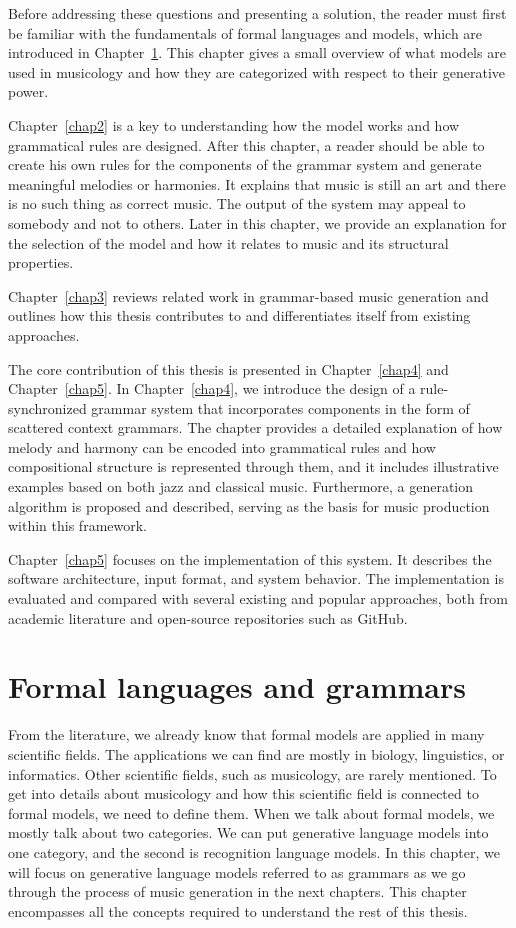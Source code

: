 Before addressing these questions and presenting a solution, the reader must first be familiar with the fundamentals of formal languages and models, which are introduced in Chapter~\ref{chap1}. This chapter gives a small overview of what models are used in musicology and how they are categorized with respect to their generative power.

Chapter~\ref{chap2} is a key to understanding how the model works and how grammatical rules are designed. After this chapter, a reader should be able to create his own rules for the components of the grammar system and generate meaningful melodies or harmonies. It explains that music is still an art and there is no such thing as correct music. The output of the system may appeal to somebody and not to others. Later in this chapter, we provide an explanation for the selection of the model and how it relates to music and its structural properties.

Chapter~\ref{chap3} reviews related work in grammar-based music generation and outlines how this thesis contributes to and differentiates itself from existing approaches.

The core contribution of this thesis is presented in Chapter~\ref{chap4} and Chapter~\ref{chap5}. In Chapter~\ref{chap4}, we introduce the design of a rule-synchronized grammar system that incorporates components in the form of scattered context grammars. The chapter provides a detailed explanation of how melody and harmony can be encoded into grammatical rules and how compositional structure is represented through them, and it includes illustrative examples based on both jazz and classical music. Furthermore, a generation algorithm is proposed and described, serving as the basis for music production within this framework.

Chapter~\ref{chap5} focuses on the implementation of this system. It describes the software architecture, input format, and system behavior. The implementation is evaluated and compared with several existing and popular approaches, both from academic literature and open-source repositories such as GitHub.

\chapter{Formal languages and grammars}
\label{chap1}
From the literature, we already know that formal models are applied in many scientific fields. The applications we can find are mostly in biology, linguistics, or informatics. Other scientific fields, such as musicology, are rarely mentioned. To get into details about musicology and how this scientific field is connected to formal models, we need to define them. When we talk about formal models, we mostly talk about two categories. We can put generative language models into one category, and the second is recognition language models. In this chapter, we will focus on generative language models referred to as grammars as we go through the process of music generation in the next chapters. This chapter encompasses all the concepts required to understand the rest of this thesis.

